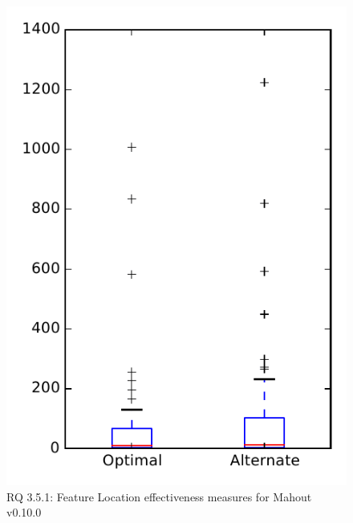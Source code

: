 
\begin{figure}
\centering
\includegraphics[height=0.4\textheight]{figures/combo/flt_rq1_mahout}
\caption{RQ 3.5.1: Feature Location effectiveness measures for Mahout v0.10.0}
\label{fig:flt:rq1:mahout}
\end{figure}
